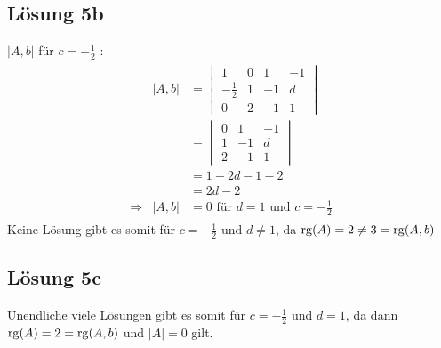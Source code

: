 \documentclass[main.tex]{subfiles}
\begin{document}
\subsection{Lösung 5b}
$|A,b|$ für $c=-\frac{1}{2}$ :
\begin{align*}
    \begin{array}{rrl}
        & |A,b| & = \begin{vmatrix}
            1 & 0 & 1 & -1\\
            -\frac{1}{2} & 1 & -1 & d\\
            0 & 2 & -1 & 1
        \end{vmatrix}\\[7mm]
        & & = \begin{vmatrix}
            0 & 1 & -1\\
            1 & -1 & d\\
            2 & -1 & 1
        \end{vmatrix}\\[7mm]
        & & = 1 + 2d - 1 - 2\\
        & & = 2d - 2\\
        \Rightarrow & |A,b| & = 0 \text{ für } d = 1 \text{ und } c = -\frac{1}{2}
    \end{array}
\end{align*}
Keine Lösung gibt es somit für $c = -\frac{1}{2}$ und $d \neq 1$, da $\operatorname{rg}(A) = 2 \neq 3 = \operatorname{rg}(A,b)$

\subsection{Lösung 5c}
Unendliche viele Lösungen gibt es somit für $c = -\frac{1}{2}$ und $d = 1$, da dann \\
	$\operatorname{rg}(A) = 2 = \operatorname{rg}(A,b)$ und $|A| = 0$ gilt.
\end{document}

